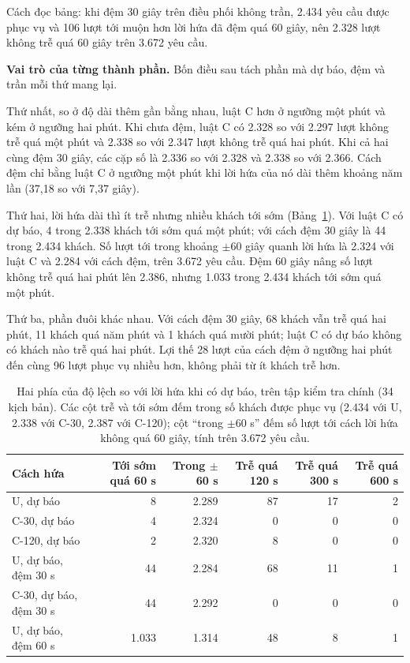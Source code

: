 Cách đọc bảng: khi đệm 30 giây trên điều phối không trần, 2.434 yêu cầu được phục vụ và 106 lượt tới muộn hơn lời
hứa đã đệm quá 60 giây, nên 2.328 lượt không trễ quá 60 giây trên 3.672 yêu cầu.

\textbf{Vai trò của từng thành phần.} Bốn điều sau tách phần mà dự báo, đệm và trần mỗi thứ mang lại.

Thứ nhất, so ở độ dài thêm gần bằng nhau, luật C hơn ở ngưỡng một phút và kém ở ngưỡng hai phút. Khi chưa đệm,
luật C có 2.328 so với 2.297 lượt không trễ quá một phút và 2.338 so với 2.347 lượt không trễ quá hai phút. Khi cả
hai cùng đệm 30 giây, các cặp số là 2.336 so với 2.328 và 2.338 so với 2.366. Cách đệm chỉ bằng luật C ở ngưỡng
một phút khi lời hứa của nó dài thêm khoảng năm lần (37,18 so với 7,37 giây).

Thứ hai, lời hứa dài thì ít trễ nhưng nhiều khách tới sớm (Bảng~\ref{bang:c4-haiphia}). Với luật C có dự báo, 4
trong 2.338 khách tới sớm quá một phút; với cách đệm 30 giây là 44 trong 2.434 khách. Số lượt tới trong khoảng
$\pm$60 giây quanh lời hứa là 2.324 với luật C và 2.284 với cách đệm, trên 3.672 yêu cầu. Đệm 60 giây nâng số lượt
không trễ quá hai phút lên 2.386, nhưng 1.033 trong 2.434 khách tới sớm quá một phút.

Thứ ba, phần đuôi khác nhau. Với cách đệm 30 giây, 68 khách vẫn trễ quá hai phút, 11 khách quá năm phút và 1 khách
quá mười phút; luật C có dự báo không có khách nào trễ quá hai phút. Lợi thế 28 lượt của cách đệm ở ngưỡng hai phút
đến cùng 96 lượt phục vụ nhiều hơn, không phải từ ít khách trễ hơn.

\begin{table}[htbp]
\centering
\caption{Hai phía của độ lệch so với lời hứa khi có dự báo, trên tập kiểm tra chính (34 kịch bản). Các cột trễ và
tới sớm đếm trong số khách được phục vụ (2.434 với U, 2.338 với C-30, 2.387 với C-120); cột ``trong $\pm$60 s''
đếm số lượt tới cách lời hứa không quá 60 giây, tính trên 3.672 yêu cầu.}
\label{bang:c4-haiphia}
\small
\begin{tabular}{@{}p{4.4cm}rrrrr@{}}
\toprule
\textbf{Cách hứa} & \textbf{Tới sớm quá 60 s} & \textbf{Trong $\pm$60 s} & \textbf{Trễ quá 120 s} &
\textbf{Trễ quá 300 s} & \textbf{Trễ quá 600 s}\\
\midrule
U, dự báo & 8 & 2.289 & 87 & 17 & 2\\
C-30, dự báo & 4 & 2.324 & 0 & 0 & 0\\
C-120, dự báo & 2 & 2.320 & 8 & 0 & 0\\
U, dự báo, đệm 30 s & 44 & 2.284 & 68 & 11 & 1\\
C-30, dự báo, đệm 30 s & 44 & 2.292 & 0 & 0 & 0\\
U, dự báo, đệm 60 s & 1.033 & 1.314 & 48 & 8 & 1\\
\bottomrule
\end{tabular}
\end{table}

